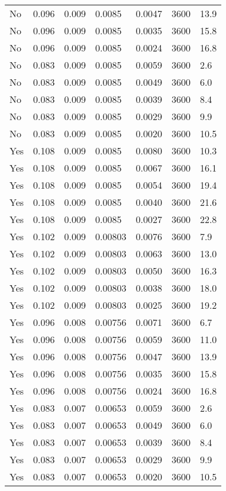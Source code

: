 \begin{longtable}{p{}C{0.10\textwidth}C{0.10\textwidth}C{0.10\textwidth}C{0.10\textwidth}C{0.10\textwidth}C{0.10\textwidth}}
    No & 0.096 & 0.009 & 0.0085 & 0.0047 & 3600 & 13.9 \\
    No & 0.096 & 0.009 & 0.0085 & 0.0035 & 3600 & 15.8 \\
    No & 0.096 & 0.009 & 0.0085 & 0.0024 & 3600 & 16.8 \\
    No & 0.083 & 0.009 & 0.0085 & 0.0059 & 3600 & 2.6 \\
    No & 0.083 & 0.009 & 0.0085 & 0.0049 & 3600 & 6.0 \\
    No & 0.083 & 0.009 & 0.0085 & 0.0039 & 3600 & 8.4 \\
    No & 0.083 & 0.009 & 0.0085 & 0.0029 & 3600 & 9.9 \\
    No & 0.083 & 0.009 & 0.0085 & 0.0020 & 3600 & 10.5 \\
    Yes & 0.108 & 0.009 & 0.0085 & 0.0080 & 3600 & 10.3 \\
    Yes & 0.108 & 0.009 & 0.0085 & 0.0067 & 3600 & 16.1 \\
    Yes & 0.108 & 0.009 & 0.0085 & 0.0054 & 3600 & 19.4 \\
    Yes & 0.108 & 0.009 & 0.0085 & 0.0040 & 3600 & 21.6 \\
    Yes & 0.108 & 0.009 & 0.0085 & 0.0027 & 3600 & 22.8 \\
    Yes & 0.102 & 0.009 & 0.00803 & 0.0076 & 3600 & 7.9 \\
    Yes & 0.102 & 0.009 & 0.00803 & 0.0063 & 3600 & 13.0 \\
    Yes & 0.102 & 0.009 & 0.00803 & 0.0050 & 3600 & 16.3 \\
    Yes & 0.102 & 0.009 & 0.00803 & 0.0038 & 3600 & 18.0 \\
    Yes & 0.102 & 0.009 & 0.00803 & 0.0025 & 3600 & 19.2 \\
    Yes & 0.096 & 0.008 & 0.00756 & 0.0071 & 3600 & 6.7 \\
    Yes & 0.096 & 0.008 & 0.00756 & 0.0059 & 3600 & 11.0 \\
    Yes & 0.096 & 0.008 & 0.00756 & 0.0047 & 3600 & 13.9 \\
    Yes & 0.096 & 0.008 & 0.00756 & 0.0035 & 3600 & 15.8 \\
    Yes & 0.096 & 0.008 & 0.00756 & 0.0024 & 3600 & 16.8 \\
    Yes & 0.083 & 0.007 & 0.00653 & 0.0059 & 3600 & 2.6 \\
    Yes & 0.083 & 0.007 & 0.00653 & 0.0049 & 3600 & 6.0 \\
    Yes & 0.083 & 0.007 & 0.00653 & 0.0039 & 3600 & 8.4 \\
    Yes & 0.083 & 0.007 & 0.00653 & 0.0029 & 3600 & 9.9 \\
    Yes & 0.083 & 0.007 & 0.00653 & 0.0020 & 3600 & 10.5 \\
    \bottomrule
\end{longtable}

